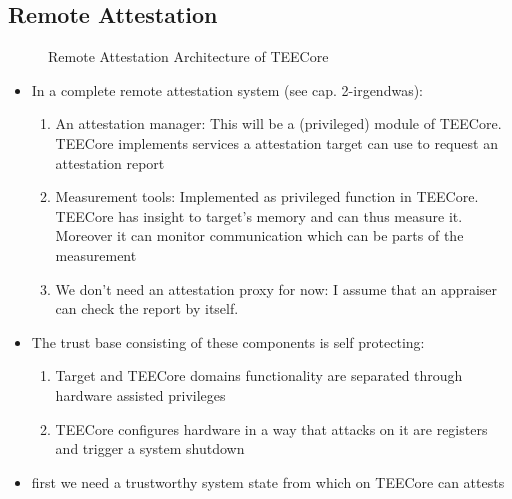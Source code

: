 \subsection{Remote Attestation}
\begin{figure}
    \begin{center}
        
        \caption{Remote Attestation Architecture of TEECore}
        \label{fig:30:tee_ra}
    \end{center}
\end{figure}
\begin{itemize}
    \item In a complete remote attestation system (see cap. 2-irgendwas):
          \begin{enumerate}
              \item An attestation manager: This will be a (privileged) module of
                    TEECore. TEECore implements services a attestation target can use to
                    request an attestation report
              \item Measurement tools: Implemented as privileged function in TEECore.
                    TEECore has insight to target's memory and can thus measure it. Moreover
                    it can monitor communication which can be parts of the measurement
              \item We don't need an attestation proxy for now: I assume that an
                    appraiser can check the report by itself.
          \end{enumerate}
    \item The trust base consisting of these components is self protecting:
          \begin{enumerate}
              \item Target and TEECore domains functionality are separated
                    through hardware assisted privileges
              \item TEECore configures hardware in a way that attacks on it are registers and trigger a system shutdown
          \end{enumerate}
    \item first we need a trustworthy system state from which on TEECore can attests
\end{itemize}

